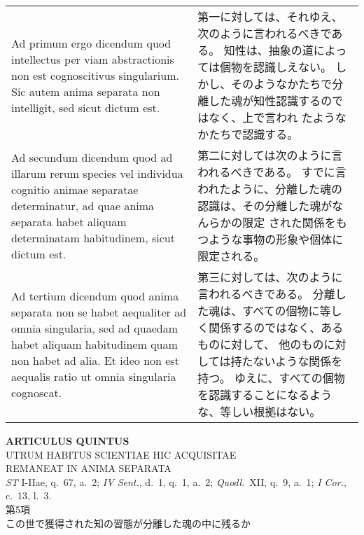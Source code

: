 \documentclass[10pt]{jsarticle} %
\begin{document}
\begin{longtable}{p{21em}p{21em}}
\\

{\sc Ad primum ergo dicendum} quod intellectus per
 viam abstractionis non est cognoscitivus singularium. Sic autem anima
 separata non intelligit, sed sicut dictum est.


&

第一に対しては、それゆえ、次のように言われるべきである。
知性は、抽象の道によっては個物を認識しえない。
しかし、そのようなかたちで分離した魂が知性認識するのではなく、上で言われ
 たようなかたちで認識する。

\\





Ad secundum dicendum quod ad illarum rerum
 species vel individua cognitio animae separatae determinatur, ad quae
 anima separata habet aliquam determinatam habitudinem, sicut dictum
 est.

&

第二に対しては次のように言われるべきである。
すでに言われたように、分離した魂の認識は、その分離した魂がなんらかの限定
 された関係をもつような事物の形象や個体に限定される。


\\



Ad tertium dicendum quod anima separata non
 se habet aequaliter ad omnia singularia, sed ad quaedam habet aliquam
 habitudinem quam non habet ad alia. Et ideo non est aequalis ratio ut
 omnia singularia cognoscat.

&

第三に対しては、次のように言われるべきである。
分離した魂は、すべての個物に等しく関係するのではなく、あるものに対して、
 他のものに対しては持たないような関係を持つ。
ゆえに、すべての個物を認識することになるような、等しい根拠はない。





\end{longtable}

\newpage
{}

\begin{center}
 {\Large {\bf ARTICULUS QUINTUS}}\\
 {\large UTRUM HABITUS SCIENTIAE HIC ACQUISITAE\\ REMANEAT IN ANIMA
 SEPARATA}\\
 {\footnotesize {\it ST} I-IIae, q.~67, a.~2; {\it IV Sent.}, d.~1, q.~1,
 a.~2; {\it Quodl.}~XII, q.~9, a.~1; {\it I Cor.}, c.~13, l.~3.}\\
 {\Large 第5項\\この世で獲得された知の習態が分離した魂の中に残るか}
\end{center}
\end{document}
